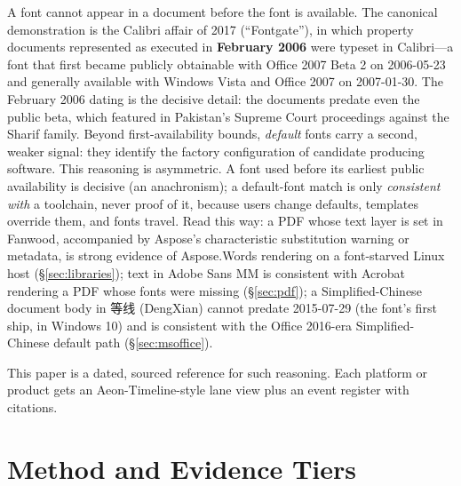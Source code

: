 \documentclass[10pt,a4paper]{article}
\begin{document}
A font cannot appear in a document before the font is available. The canonical
demonstration is the Calibri affair of 2017 (``Fontgate''), in which property
documents represented as executed in \textbf{February 2006} were typeset in
Calibri---a font that first became publicly obtainable with Office 2007 Beta 2 on
2006-05-23 and generally available with Windows Vista and Office 2007 on
2007-01-30. The February 2006 dating is the decisive detail: the documents predate
even the public beta, which featured in Pakistan's Supreme Court proceedings against
the Sharif family.\cite{intro-fontgate} Beyond first-availability bounds,
\emph{default} fonts carry a second, weaker signal: they identify the factory
configuration of candidate producing software. This reasoning is asymmetric. A font
used before its earliest public availability is decisive (an anachronism); a
default-font match is only \emph{consistent with} a toolchain, never proof of it,
because users change defaults, templates override them, and fonts travel. Read this
way: a PDF whose text layer is set in Fanwood, accompanied by Aspose's
characteristic substitution warning or metadata, is strong evidence of Aspose.Words
rendering on a font-starved Linux host (\S\ref{sec:libraries}); text in Adobe Sans
MM is consistent with Acrobat rendering a PDF whose fonts were missing
(\S\ref{sec:pdf}); a Simplified-Chinese document body in 等线 (DengXian) cannot
predate 2015-07-29 (the font's first ship, in Windows 10) and is consistent with the
Office 2016-era Simplified-Chinese default path (\S\ref{sec:msoffice}).

This paper is a dated, sourced reference for such reasoning. Each platform or product
gets an Aeon-Timeline-style lane view plus an event register with citations.

\section{Method and Evidence Tiers}\label{sec:method}
\end{document}
